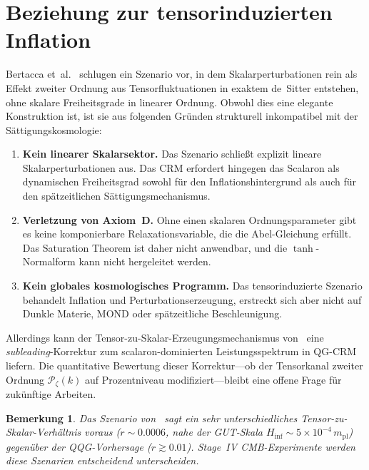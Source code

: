 \documentclass[aps,prd,twocolumn,superscriptaddress,nofootinbib]{revtex4-2}
\newtheorem{remark}{Bemerkung}
\begin{document}
\section{Beziehung zur tensorinduzierten Inflation}
\label{sec:tensor-inflation}

Bertacca et~al.~\cite{Bertacca2025} schlugen ein Szenario vor, in dem Skalarperturbationen rein als Effekt zweiter Ordnung aus Tensorfluktuationen in exaktem de~Sitter entstehen, ohne skalare Freiheitsgrade in linearer Ordnung. Obwohl dies eine elegante Konstruktion ist, ist sie aus folgenden Gründen strukturell inkompatibel mit der Sättigungskosmologie:

\begin{enumerate}
\item \textbf{Kein linearer Skalarsektor.} Das Szenario schließt explizit lineare Skalarperturbationen aus. Das CRM erfordert hingegen das Scalaron als dynamischen Freiheitsgrad sowohl für den Inflationshintergrund als auch für den spätzeitlichen Sättigungsmechanismus.

\item \textbf{Verletzung von Axiom~D.} Ohne einen skalaren Ordnungsparameter gibt es keine komponierbare Relaxationsvariable, die die Abel-Gleichung erfüllt. Das Saturation Theorem ist daher nicht anwendbar, und die $\tanh$-Normalform kann nicht hergeleitet werden.

\item \textbf{Kein globales kosmologisches Programm.} Das tensorinduzierte Szenario behandelt Inflation und Perturbationserzeugung, erstreckt sich aber nicht auf Dunkle Materie, MOND oder spätzeitliche Beschleunigung.
\end{enumerate}

Allerdings kann der Tensor-zu-Skalar-Erzeugungsmechanismus von~\cite{Bertacca2025} eine \textit{subleading}-Korrektur zum scalaron-dominierten Leistungsspektrum in QG-CRM liefern. Die quantitative Bewertung dieser Korrektur---ob der Tensorkanal zweiter Ordnung $\mathcal{P}_\zeta(k)$ auf Prozentniveau modifiziert---bleibt eine offene Frage für zukünftige Arbeiten.

\begin{remark}
Das Szenario von~\cite{Bertacca2025} sagt ein sehr unterschiedliches Tensor-zu-Skalar-Verhältnis voraus ($r \sim 0.0006$, nahe der GUT-Skala $H_\mathrm{inf} \sim 5 \times 10^{-4}\,m_\mathrm{pl}$) gegenüber der QQG-Vorhersage ($r \gtrsim 0.01$). Stage~IV CMB-Experimente werden diese Szenarien entscheidend unterscheiden.
\end{remark}
\end{document}
